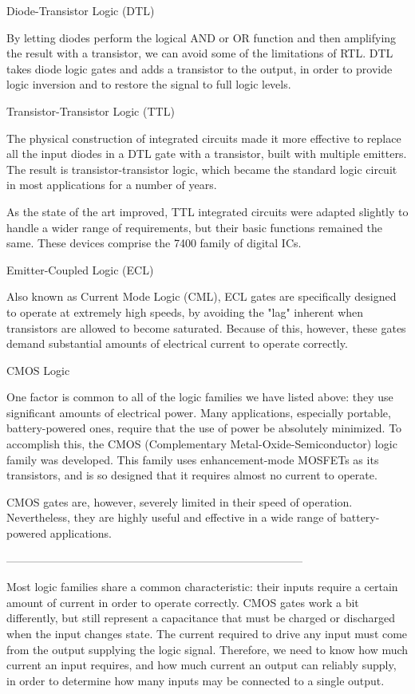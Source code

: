Diode-Transistor Logic (DTL)

By letting diodes perform the logical AND or OR function and then amplifying the result with a transistor, we can avoid some of the limitations of RTL. DTL takes diode logic gates and adds a transistor to the output, in order to provide logic inversion and to restore the signal to full logic levels.



Transistor-Transistor Logic (TTL)


The physical construction of integrated circuits made it more effective to replace all the input diodes in a DTL gate with a transistor, built with multiple emitters. The result is transistor-transistor logic, which became the standard logic circuit in most applications for a number of years.

As the state of the art improved, TTL integrated circuits were adapted slightly to handle a wider range of requirements, but their basic functions remained the same. These devices comprise the 7400 family of digital ICs.



Emitter-Coupled Logic (ECL)

Also known as Current Mode Logic (CML), ECL gates are specifically designed to operate at extremely high speeds, by avoiding the "lag" inherent when transistors are allowed to become saturated. Because of this, however, these gates demand substantial amounts of electrical current to operate correctly.



CMOS Logic

One factor is common to all of the logic families we have listed above: they use significant amounts of electrical power. Many applications, especially portable, battery-powered ones, require that the use of power be absolutely minimized. To accomplish this, the CMOS (Complementary Metal-Oxide-Semiconductor) logic family was developed. This family uses enhancement-mode MOSFETs as its transistors, and is so designed that it requires almost no current to operate.

CMOS gates are, however, severely limited in their speed of operation. Nevertheless, they are highly useful and effective in a wide range of battery-powered applications.



--------------------------------------------------------------------------------

Most logic families share a common characteristic: their inputs require a certain amount of current in order to operate correctly. CMOS gates work a bit differently, but still represent a capacitance that must be charged or discharged when the input changes state. The current required to drive any input must come from the output supplying the logic signal. Therefore, we need to know how much current an input requires, and how much current an output can reliably supply, in order to determine how many inputs may be connected to a single output.

